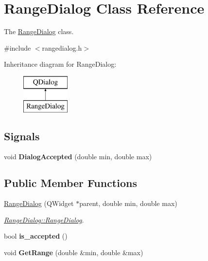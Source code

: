 \hypertarget{class_range_dialog}{}\section{Range\+Dialog Class Reference}
\label{class_range_dialog}


The \hyperlink{class_range_dialog}{Range\+Dialog} class.  




{\ttfamily \#include $<$rangedialog.\+h$>$}

Inheritance diagram for Range\+Dialog\+:\begin{figure}[H]
\begin{center}
\leavevmode
\includegraphics[height=2.000000cm]{class_range_dialog}
\end{center}
\end{figure}
\subsection*{Signals}
\begin{DoxyCompactItemize}
\item 
void {\bfseries Dialog\+Accepted} (double min, double max)\hypertarget{class_range_dialog_aeaebb5984999d8a4b13497b6f0bdc390}{}\label{class_range_dialog_aeaebb5984999d8a4b13497b6f0bdc390}

\end{DoxyCompactItemize}
\subsection*{Public Member Functions}
\begin{DoxyCompactItemize}
\item 
\hyperlink{class_range_dialog_a1d209f3a367d76fd1ef1f87ddbe738be}{Range\+Dialog} (Q\+Widget $\ast$parent, double min, double max)
\begin{DoxyCompactList}\small\item\em \hyperlink{class_range_dialog_a1d209f3a367d76fd1ef1f87ddbe738be}{Range\+Dialog\+::\+Range\+Dialog}. \end{DoxyCompactList}\item 
bool {\bfseries is\+\_\+accepted} ()\hypertarget{class_range_dialog_a5558e31f9999a7e421e973033abeab87}{}\label{class_range_dialog_a5558e31f9999a7e421e973033abeab87}

\item 
void {\bfseries Get\+Range} (double \&min, double \&max)\hypertarget{class_range_dialog_af26df0375cb74ec411d3f07e8e14423b}{}\label{class_range_dialog_af26df0375cb74ec411d3f07e8e14423b}

\end{DoxyCompactItemize}


